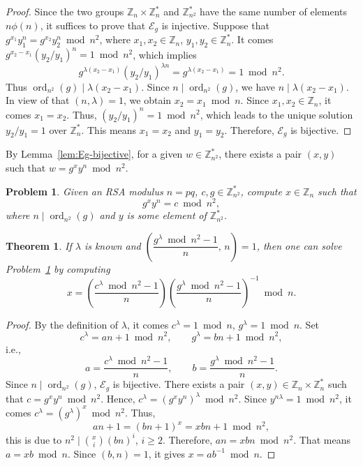 \documentclass[11pt,a4paper]{article}
\newtheorem{theorem}[definition]{Theorem}
\newtheorem{problem}[definition]{Problem}
\theoremstyle{remark}
\newcommand{\Z}{\mathbb{Z}}
\newcommand{\ord}{\operatorname{ord}}
\newcommand{\E}{\mathcal{E}}
\begin{document}
\begin{proof}
Since the two groups $\Z_n\times\Z_n^*$ and $\Z_{n^2}^*$ have the same number of elements $n\phi(n)$, it suffices to prove that $\E_g$ is injective. Suppose that $g^{x_1}y_1^n = g^{x_2}y_2^n \bmod n^2$, where $x_1,x_2\in\Z_n$, $y_1,y_2\in\Z_n^*$. It comes $g^{x_2-x_1}(y_2/y_1)^n = 1 \bmod n^2$, which implies
\[
g^{\lambda(x_2-x_1)}(y_2/y_1)^{\lambda n} = g^{\lambda(x_2-x_1)} = 1 \bmod n^2.
\]
Thus $\ord_{n^2}(g) \mid \lambda(x_2-x_1)$. Since $n\mid\ord_{n^2}(g)$, we have $n \mid \lambda(x_2-x_1)$. In view of that $(n,\lambda)=1$, we obtain $x_2 = x_1 \bmod n$. Since $x_1,x_2\in\Z_n$, it comes $x_1=x_2$. Thus, $(y_2/y_1)^n = 1 \bmod n^2$, which leads to the unique solution $y_2/y_1=1$ over $\Z_n^*$. This means $x_1=x_2$ and $y_1=y_2$. Therefore, $\E_g$ is bijective.
\end{proof}

By Lemma~\ref{lem:Eg-bijective}, for a given $w\in\Z_{n^2}^*$, there exists a pair $(x,y)$ such that $w = g^x y^n \bmod n^2$.

\begin{problem}\label{prob:1}
Given an RSA modulus $n=pq$, $c,g\in\Z_{n^2}^*$, compute $x\in\Z_n$ such that
\[
g^x y^n = c \bmod n^2,
\]
where $n\mid\ord_{n^2}(g)$ and $y$ is some element of $\Z_{n^2}^*$.
\end{problem}

\begin{theorem}\label{thm:1}
If $\lambda$ is known and $\left(\dfrac{g^\lambda \bmod n^2 - 1}{n},\, n\right)=1$, then one can solve Problem~\ref{prob:1} by computing
\[
x = \left(\frac{c^\lambda \bmod n^2 - 1}{n}\right)\left(\frac{g^\lambda \bmod n^2 - 1}{n}\right)^{-1} \bmod n.
\]
\end{theorem}

\begin{proof}
By the definition of $\lambda$, it comes $c^\lambda = 1 \bmod n$, $g^\lambda = 1 \bmod n$. Set
\[
c^\lambda = an+1 \bmod n^2, \qquad g^\lambda = bn+1 \bmod n^2,
\]
i.e.,
\[
a = \frac{c^\lambda \bmod n^2 - 1}{n}, \qquad b = \frac{g^\lambda \bmod n^2 - 1}{n}.
\]
Since $n\mid\ord_{n^2}(g)$, $\E_g$ is bijective. There exists a pair $(x,y)\in\Z_n\times\Z_n^*$ such that $c = g^x y^n \bmod n^2$. Hence, $c^\lambda = (g^x y^n)^\lambda \bmod n^2$. Since $y^{n\lambda}=1 \bmod n^2$, it comes $c^\lambda = (g^\lambda)^x \bmod n^2$. Thus,
\[
an+1 = (bn+1)^x = xbn+1 \bmod n^2,
\]
this is due to $n^2 \mid \binom{x}{i}(bn)^i$, $i\ge 2$. Therefore, $an = xbn \bmod n^2$. That means $a = xb \bmod n$. Since $(b,n)=1$, it gives $x = ab^{-1} \bmod n$.
\end{proof}
\end{document}
